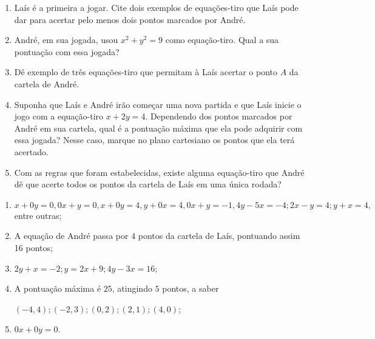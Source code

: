 \documentclass[10 pt,usenames,dvipsnames, oneside]{article}
\begin{document}
\begin{enumerate}
\item {}
	Laís é a primeira a jogar. Cite dois exemplos de equações-tiro que Laís pode dar para acertar pelo menos dois pontos marcados por André.

\item {}
	André, em sua jogada, usou $x^2 + y^2 = 9$ como equação-tiro. Qual a sua pontuação com essa jogada?

\item {}
	Dê exemplo de três equações-tiro que permitam à Laís acertar o ponto $A$ da cartela de André.

\item {}
	Suponha que Laís e André irão começar uma nova partida e que Laís inicie o jogo com a equação-tiro $x+2y = 4$. Dependendo dos pontos marcados por André em sua cartela, qual é a pontuação máxima que ela pode adquirir com essa jogada? Nesse caso, marque no plano cartesiano os pontos que ela terá acertado.

\item {}
	Com as regras que foram estabelecidas, existe alguma equação-tiro que André dê que acerte todos os pontos da cartela de Laís em uma única rodada?

\end{enumerate}

\ifdefined\prof
\begin{solucao}
\begin{enumerate}
\item $x+0y=0, 0x+y=0, x+0y=4, y+0x=4, 0x+y=-1, 4y-5x=-4; 2x-y=4; y+x=4,$ entre outras;
\item A equação de André passa por 4 pontos da cartela de Laís,  pontuando assim 16 pontos;
\item $2y+x=-2; y=2x+9; 4y-3x=16$;
\item A pontuação máxima é $25$, atingindo $5$ pontos, a saber 

$(-4,4); (-2,3); (0,2); (2,1); (4,0)$;
\item $0x+0y=0$.
\end{enumerate}
\end{solucao}
\fi
\end{document}
